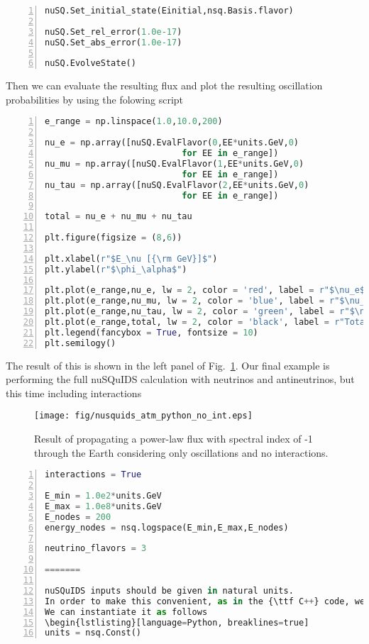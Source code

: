 \documentclass[3p,12pt]{elsarticle}
\newcommand{\ttf}{\ttfamily}
\newcounter{bla}
\begin{document}
\begin{lstlisting}[language=Python, frame=leftline, numbers=left, breaklines=true]
nuSQ.Set_initial_state(Einitial,nsq.Basis.flavor)

nuSQ.Set_rel_error(1.0e-17)
nuSQ.Set_abs_error(1.0e-17)

nuSQ.EvolveState()
\end{lstlisting}

Then we can evaluate the resulting flux and plot the resulting oscillation 
probabilities by using the folowing script

\begin{lstlisting}[language=Python, frame=leftline, numbers=left, breaklines=true]
e_range = np.linspace(1.0,10.0,200)

nu_e = np.array([nuSQ.EvalFlavor(0,EE*units.GeV,0) 
                           for EE in e_range])
nu_mu = np.array([nuSQ.EvalFlavor(1,EE*units.GeV,0) 
                           for EE in e_range])
nu_tau = np.array([nuSQ.EvalFlavor(2,EE*units.GeV,0) 
                           for EE in e_range])

total = nu_e + nu_mu + nu_tau

plt.figure(figsize = (8,6))

plt.xlabel(r"$E_\nu [{\rm GeV}]$")
plt.ylabel(r"$\phi_\alpha$")

plt.plot(e_range,nu_e, lw = 2, color = 'red', label = r"$\nu_e$")
plt.plot(e_range,nu_mu, lw = 2, color = 'blue', label = r"$\nu_\mu$")
plt.plot(e_range,nu_tau, lw = 2, color = 'green', label = r"$\nu_\tau$")
plt.plot(e_range,total, lw = 2, color = 'black', label = r"Total")
plt.legend(fancybox = True, fontsize = 10)
plt.semilogy()
\end{lstlisting}
The result of this is shown in the left panel of Fig.~\ref{fig:nusquids_atm_python_no_interaction}. Our final example is 
performing the full nuSQuIDS calculation with neutrinos and antineutrinos, but this time including interactions

\begin{figure}[h!]
  \label{fig:nusquids_atm_python_no_interaction}
  \centering
  \texttt{[image: fig/nusquids\_atm\_python\_no\_int.eps]}
  \caption{Result of propagating a power-law flux with spectral index of -1 through the Earth considering only oscillations and no interactions.}
\end{figure}

\begin{lstlisting}[language=Python, frame=leftline, numbers=left, breaklines=true]
interactions = True

E_min = 1.0e2*units.GeV
E_max = 1.0e8*units.GeV
E_nodes = 200
energy_nodes = nsq.logspace(E_min,E_max,E_nodes)

neutrino_flavors = 3

=======

nuSQuIDS inputs should be given in natural units.
In order to make this convenient, as in the {\ttf C++} code, we make use of the {\ttf SQuIDS} class {\ttf Const}.
We can instantiate it as follows
\begin{lstlisting}[language=Python, breaklines=true]
units = nsq.Const()
\end{lstlisting}
\end{document}
